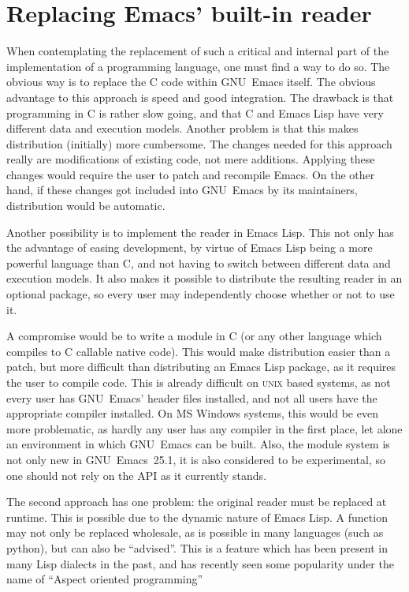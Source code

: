\documentclass[a4paper,10pt,twoside]{report}
\newcommand{\el}{Emacs Lisp}
\newcommand{\emacs}{GNU~Emacs}
\newcommand{\emacsv}[1]{GNU~Emacs~#1}
\newcommand{\unix}{\textsc{unix}}
\begin{document}
\chapter{Replacing Emacs’ built-in reader}
\label{chapter:repl-reader}

When contemplating the replacement of such a critical and internal part of the
implementation of a programming language, one must find a way to do so.  The
obvious way is to replace the C code within \emacs{} itself.  The obvious
advantage to this approach is speed and good integration.  The drawback is that
programming in C is rather slow going, and that C and \el{} have very different
data and execution models.  Another problem is that this makes distribution
(initially) more cumbersome.  The changes needed for this approach really are
modifications of existing code, not mere additions.  Applying these changes
would require the user to patch and recompile Emacs.  On the other hand, if
these changes got included into \emacs{} by its maintainers, distribution would
be automatic.

Another possibility is to implement the reader in \el.  This not only has the
advantage of easing development, by virtue of \el{} being a more powerful
language than C, and not having to switch between different data and execution
models.  It also makes it possible to distribute the resulting reader in an
optional package, so every user may independently choose whether or not to use
it.

A compromise would be to write a module in C (or any other language which
compiles to C callable native code).  This would make distribution easier than a
patch, but more difficult than distributing an \el{} package, as it requires the
user to compile code. This is already difficult on \unix{} based systems, as not
every user has \emacs{}’ header files installed, and not all users have the
appropriate compiler installed.  On MS Windows systems, this would be even more
problematic, as hardly any user has any compiler in the first place, let alone
an environment in which \emacs{} can be built.  Also, the module system is not
only new in \emacsv{25.1}, it is also considered to be experimental, so one
should not rely on the API as it currently stands.

The second approach has one problem: the original reader must be replaced at
runtime.  This is possible due to the dynamic nature of \el.  A function may not
only be replaced wholesale, as is possible in many languages (such as python),
but can also be ``advised''.  This is a feature which has been present in many
Lisp dialects in the past, and has recently seen some popularity under the name
of ``Aspect oriented programming''
\end{document}
